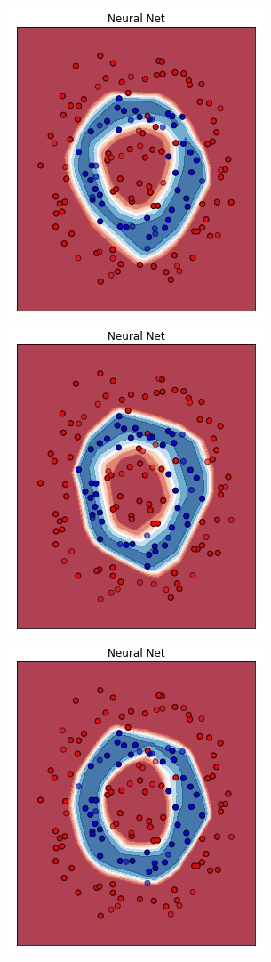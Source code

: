 \documentclass[12pt,a4paper]{report}
\begin{document}
\begin{figure}[H]
 \includegraphics[scale = 0.3]{images/circle+-rnd-log./4}
 \\
 \includegraphics[scale = 0.3]{images/circle+-rnd-log./5}
 \includegraphics[scale = 0.3]{images/circle+-rnd-log./6}

\end{figure}
\end{document}
